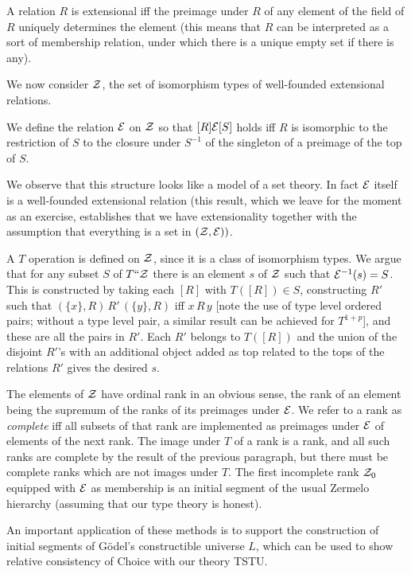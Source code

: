 \documentclass[12pt]{article}
\begin{document}
A relation $R$ is extensional iff the preimage under $R$ of any element of the field of $R$ uniquely determines the element (this means that $R$ can be interpreted as a sort of membership relation, under which there is a unique empty set if there is any).

We now consider $\cal Z$, the set of isomorphism types of well-founded extensional relations.

We define the relation $\cal E$ on $\cal Z$ so that $[R] {\cal E} [S]$ holds iff $R$ is isomorphic to the restriction of $S$ to the closure under $S^{-1}$ of the singleton of a preimage of the top of $S$.

We observe that this structure looks like a model of a set theory.  In fact $\cal E$ itself is a well-founded extensional relation (this result, which we leave for the moment as an exercise, establishes that we have extensionality together with the assumption that everything is a set in $({\cal Z},{\cal E}))$.

A $T$ operation is defined on $\cal Z$, since it is a class of isomorphism types.  We argue that for any subset $S$ of $T``{\cal Z}$ there is an element $s$ of $\cal Z$ such that ${\cal E}^{-1}(s) = S$.  This is constructed
by taking each $[R]$ with $T([R]) \in S$, constructing $R'$ such that $(\{x\},R)\, R' \,(\{y\},R)$ iff $x \,R\,y$ [note the use of type level ordered pairs;  without a type level pair, a similar result can be achieved for $T^{1+p}$], and these are all the pairs in $R'$.  Each $R'$ belongs to $T([R])$ and the union of the disjoint $R'$'s with an additional object added as top related to the tops of the relations $R'$ gives the desired $s$.

The elements of $\cal Z$ have ordinal rank in an obvious sense, the rank of an element being the supremum of the ranks of its preimages under $\cal E$.  We refer to a rank as {\em complete\/} iff all subsets of that rank are implemented
as preimages under $\cal E$ of elements of the next rank.  The image under $T$ of a rank is a rank, and all such ranks are complete by the result of the previous paragraph, but there must be complete ranks which are not images under
$T$.  The first incomplete rank ${\cal Z}_0$ equipped with $\cal E$ as membership is an initial segment of the usual Zermelo hierarchy (assuming that our type theory is honest).

An important application of these methods is to support the construction of initial segments of G\"odel's constructible universe $L$, which can be used to show relative consistency of Choice with our theory TSTU.
\end{document}
